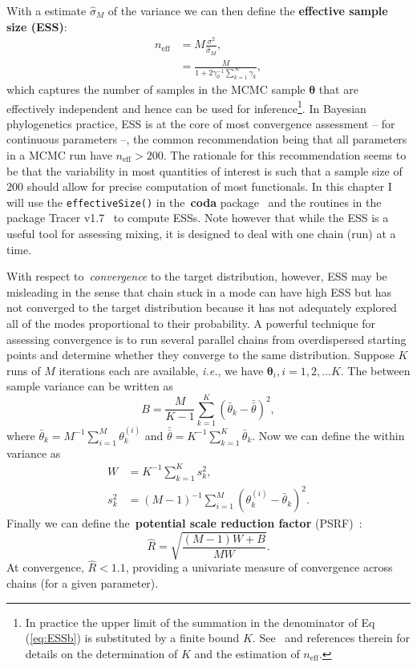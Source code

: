 With a estimate $\hat{\sigma}_M$ of the variance we can then define the \textbf{effective sample size (ESS)}:
\begin{align}
 \label{eq:ESSa}
 n_{\text{eff}} &= M\frac{\sigma^2}{\hat{\sigma}_M}, \\
  \label{eq:ESSb}
 &= \frac{M}{ 1 + 2\gamma_0^{-1}\sum_{k = 1}^\infty \gamma_k},
\end{align}
which captures the number of samples in the MCMC sample $\boldsymbol\theta$ that are effectively independent and hence can be used for inference\footnote{In practice the upper limit of the summation in the denominator of Eq (\ref{eq:ESSb}) is substituted by a finite bound $K$. See~\cite{Geyer2011} and references therein for details on the determination of $K$ and the estimation of $n_{\text{eff}}$.}.
In Bayesian phylogenetics practice, ESS is at the core of most convergence assessment -- for continuous parameters --, the common recommendation being that all parameters in a MCMC run have $n_{\text{eff}} > 200$.
The rationale for this recommendation seems to be that the variability in most quantities of interest is such that a sample size of $200$ should allow for precise computation of most functionals.
In this chapter I will use the \verb|effectiveSize()| in the~\textbf{coda} package~\citep{Plummer2006} and the routines in the package Tracer v1.7~\citep{Rambaut2018} to compute ESSs.
Note however that while the ESS is a useful tool for assessing mixing, it is designed to deal with one chain (run) at a time.

With respect to~\textit{convergence} to the target distribution, however, ESS may be misleading in the sense  that chain stuck in a mode can have high ESS but has not converged to the target distribution because it has not adequately explored all of the modes proportional to their probability.
A powerful technique for assessing convergence is to run several parallel chains from overdispersed starting points and determine whether they converge to the same distribution.
Suppose $K$ runs of $M$ iterations each are available, \textit{i.e.}, we have $\boldsymbol\theta_i, i = 1, 2, \ldots K$.
The between sample variance can be written as
\begin{equation}
\label{eq:Between}
 B = \frac{M}{K-1} \sum_{k = 1}^K \left(\bar{\theta}_k - \bar{\bar{\theta}}\right)^2, 
\end{equation}
where $\bar{\theta}_k = M^{-1}\sum_{i = 1}^M\theta_k^{(i)}$ and $\bar{\bar{\theta}} = K^{-1}\sum_{k=1}^K\bar{\theta}_k$.
Now we can define the within variance as 
\begin{align}
\label{eq:Within}
 W &=  K^{-1}\sum_{k = 1}^K s_k^2,\\
 s_k^2 & = (M-1)^{-1} \sum_{i = 1}^M \left(\theta_k^{(i)} - \bar{\theta}_k\right)^2.
\end{align}
Finally we can define the~\textbf{potential scale reduction factor} (PSRF)~\citep{Gelman1992}:
\begin{equation}
 \label{eq:PRSF}
 \hat{R} = \sqrt{\frac{ (M-1)W +  B }{MW}}.
\end{equation}
At convergence, $\hat{R} < 1.1$, providing a univariate measure of convergence across chains (for a given parameter).

